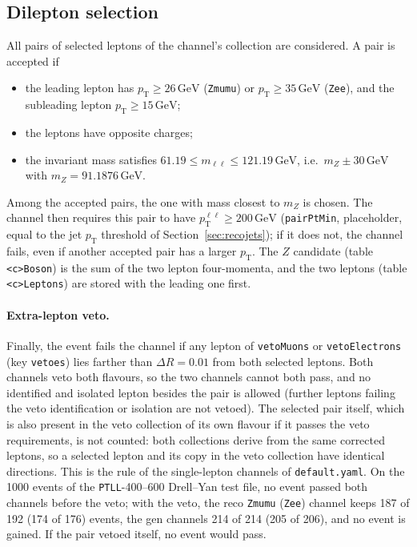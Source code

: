 \documentclass[11pt]{article}
\newcommand{\pt}{p_{\mathrm{T}}}
\newcommand{\GeV}{\ensuremath{\,\mathrm{GeV}}}
\newcommand{\ptll}{\pt^{\ell\ell}}
\newcommand{\code}[1]{\texttt{#1}}
\begin{document}
\subsection{Dilepton selection}
\label{sec:dilepton}
All pairs of selected leptons of the channel's collection are considered. A pair is accepted if
\begin{itemize}
\item the leading lepton has $\pt \geq 26\GeV$ (\code{Zmumu}) or $\pt \geq 35\GeV$ (\code{Zee}), and the subleading
  lepton $\pt \geq 15\GeV$;
\item the leptons have opposite charges;
\item the invariant mass satisfies $61.19 \leq m_{\ell\ell} \leq 121.19\GeV$, i.e.\ $m_Z \pm 30\GeV$ with
  $m_Z = 91.1876\GeV$.
\end{itemize}
Among the accepted pairs, the one with mass closest to $m_Z$ is chosen. The channel then requires this pair to have
$\ptll \geq 200\GeV$ (\code{pairPtMin}, placeholder, equal to the jet $\pt$ threshold of Section~\ref{sec:recojets}); if it does not, the channel fails, even if another accepted pair
has a larger $\pt$. The $Z$ candidate (table \code{<c>Boson}) is the sum of the two lepton four-momenta, and the two
leptons (table \code{<c>Leptons}) are stored with the leading one first.

\paragraph{Extra-lepton veto.} Finally, the event fails the channel if any lepton of \code{vetoMuons} or
\code{vetoElectrons} (key \code{vetoes}) lies farther than $\Delta R = 0.01$ from both selected leptons. Both channels
veto both flavours, so the two channels cannot both pass, and no identified and isolated lepton besides the pair is
allowed (further leptons failing the veto identification or isolation are not vetoed). The selected pair itself,
which is also present in the veto collection of its own flavour if it passes the veto requirements, is not counted:
both collections derive from the same corrected leptons, so a selected lepton and its copy in the veto collection have
identical directions. This is the rule of the single-lepton channels of \code{default.yaml}. On the 1000 events of the
\code{PTLL}-400--600 Drell--Yan test file, no event passed both channels before the veto; with the veto, the reco
\code{Zmumu} (\code{Zee}) channel keeps 187 of 192 (174 of 176) events, the gen channels 214 of 214 (205 of 206), and
no event is gained. If the pair vetoed itself, no event would pass.
\end{document}
